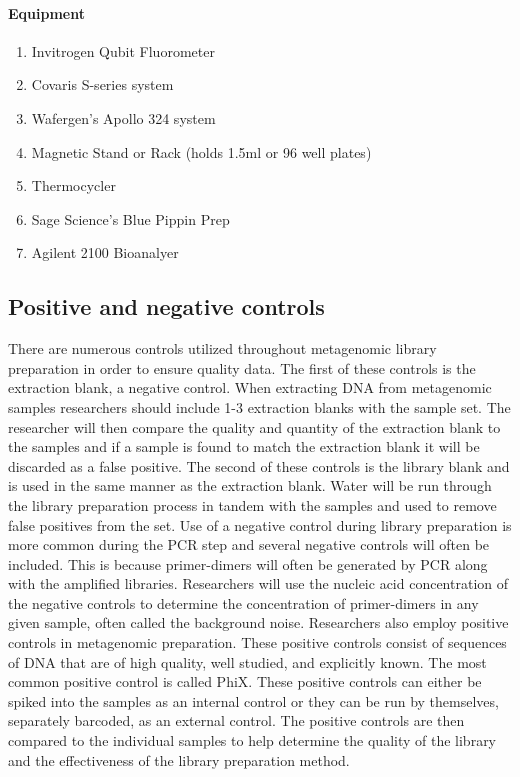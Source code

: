 \documentclass[graybox]{svmult}
\begin{document}
\paragraph{Equipment}
\begin{svgraybox}
\begin{enumerate}
\item{    Invitrogen Qubit Fluorometer}
\item{      Covaris S-series system}
\item{      Wafergen’s Apollo 324 system}
\item{      Magnetic Stand or Rack (holds 1.5ml or 96 well plates)}
\item{      Thermocycler}
\item{      Sage Science’s Blue Pippin Prep}
\item{      Agilent 2100 Bioanalyer}
\end{enumerate}
\end{svgraybox}

\subsection{Positive and negative controls }

There are numerous controls utilized throughout metagenomic library preparation in order to ensure quality data. The first of these controls is the extraction blank, a negative control. When extracting DNA from metagenomic samples researchers should include 1-3 extraction blanks with the sample set. The researcher will then compare the quality and quantity of the extraction blank to the samples and if a sample is found to match the extraction blank it will be discarded as a false positive.
%
The second of these controls is the library blank and is used in the same manner as the extraction blank. Water will be run through the library preparation process in tandem with the samples and used to remove false positives from the set.
%
Use of a negative control during library preparation is more common during the PCR step and several negative controls will often be included. This is because primer-dimers will often be generated by PCR along with the amplified libraries. Researchers will use the nucleic acid concentration of the negative controls to determine the concentration of primer-dimers in any given sample, often called the background noise.
%
Researchers also employ positive controls in metagenomic preparation. These positive controls consist of sequences of DNA that are of high quality, well studied, and explicitly known. The most common positive control is called PhiX. These positive controls can either be spiked into the samples as an internal control or they can be run by themselves, separately barcoded, as an external control. The positive controls are then compared to the individual samples to help determine the quality of the library and the effectiveness of the library preparation method. 
\end{document}
